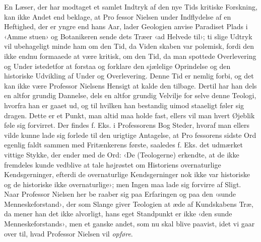 \documentclass[12pt,a4paper,openany]{book}
\newcommand{\opage}[1]{\marginnote{\footnotesize\textit{[#1]}}}
\begin{document}
En Læser, der har modtaget et samlet Indtryk af den nye
Tids kritiske Forskning, kan ikke Andet end beklage, at Pro\-%
fessor Nielsen under Indflydelse af en Heftighed, der er yngre
end hans Aar, lader Geologien anvise Paradiset Plads i ‹Amme\-%
stuen› og Botanikeren sende dets Træer ‹ad Helvede til›; ti
slige Udtryk vil ubehageligt minde ham om den Tid, da Viden\-%
skaben var polemisk, fordi den ikke endnu formaaede at være
kritisk, om den Tid, da man spottede Overlevering og Under
istedetfor at forstaa og forklare den sjælelige Oprindelse og den
historiske Udvikling af Under og Overlevering. Denne Tid er
nemlig forbi, og det kan ikke være Professor Nielsens Hensigt
at kalde den tilbage. Dertil har han dels en altfor grundig
Dannelse, dels en altfor grundig Velvilje for selve denne Teologi,
hvorfra han er gaaet ud, og til hvilken han bestandig uimod\-%
staaeligt føler sig dragen. Dette er et Punkt, man altid
maa holde fast, ellers vil man hvert Øjeblik føle sig forvirret.
Der findes f. Eks. i Professorens Bog Steder, hvoraf man ellers
\opage{87}vilde kunne lade sig forlede til den urigtige Antagelse, at Pro\-%
fessorens sidste Ord egenlig faldt sammen med Fritænkerens
første, saaledes f. Eks. det udmærket vittige Stykke, der ender
med de Ord: ‹De (Teologerne) erkendte, at de ikke fremdeles
kunde vedblive at tale højrøstet om Historiens overnaturlige
Kendsgerninger, efterdi de overnaturlige Kendsgerninger nok ikke
var historiske og de historiske ikke overnaturlige›; men Ingen
maa lade sig forvirre af Sligt. Naar Professor Nielsen her be\-%
raaber sig paa Erfaringen og paa den ‹sunde Menneskeforstand›,
der som Slange giver Teologien at æde af Kundskabens Træ,
da mener han det ikke alvorligt, hans eget Standpunkt er ikke
‹den sunde Menneskeforstands›, men et ganske andet, som nu
skal blive paavist, idet vi gaar over til, hvad Professor Nielsen
vil \emph{opføre}.
\end{document}
